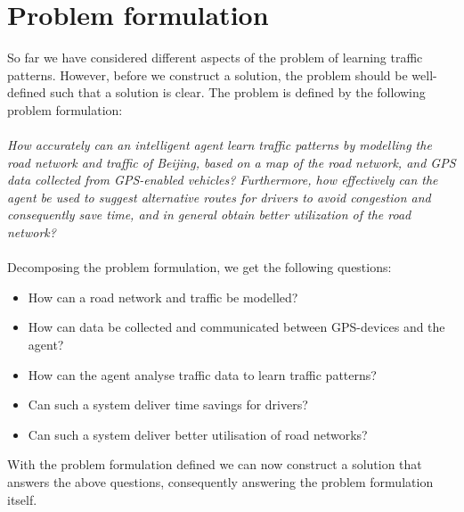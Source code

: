 \section{Problem formulation}
So far we have considered different aspects of the problem of learning traffic patterns. However, before we construct a solution, the problem should be well-defined such that a solution is clear. The problem is defined by the following problem formulation:
\\\\
\emph{How accurately can an intelligent agent learn traffic patterns by modelling the road network and traffic of Beijing, based on a map of the road network, and GPS data collected from GPS-enabled vehicles? Furthermore, how effectively can the agent be used to suggest alternative routes for drivers to avoid congestion and consequently save time, and in general obtain better utilization of the road network?}
\\\\
Decomposing the problem formulation, we get the following questions:

\begin{itemize}
\item How can a road network and traffic be modelled?
\item How can data be collected and communicated between GPS-devices and the agent?
\item How can the agent analyse traffic data to learn traffic patterns?
\item Can such a system deliver time savings for drivers?
\item Can such a system deliver better utilisation of road networks?
\end{itemize}

With the problem formulation defined we can now construct a solution that answers the above questions, consequently answering the problem formulation itself.


% 